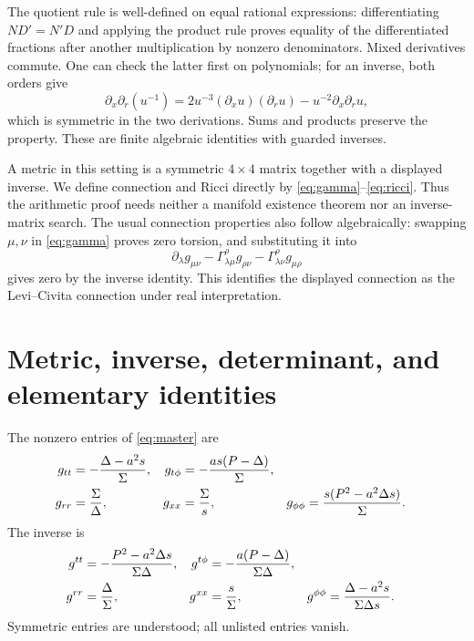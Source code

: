 \documentclass[11pt,a4paper]{article}
\numberwithin{equation}{section}
\theoremstyle{definition}\newtheorem{definition}[theorem]{Definition}
\theoremstyle{remark}\newtheorem{remark}[theorem]{Remark}
\begin{document}
The quotient rule is well-defined on equal rational expressions: differentiating $ND'=N'D$ and applying the product rule proves equality of the differentiated fractions after another multiplication by nonzero denominators. Mixed derivatives commute. One can check the latter first on polynomials; for an inverse, both orders give
\[
 \partial_x\partial_r(u^{-1})
 =2u^{-3}(\partial_xu)(\partial_ru)-u^{-2}\partial_x\partial_ru,
\]
which is symmetric in the two derivations. Sums and products preserve the property. These are finite algebraic identities with guarded inverses.

A metric in this setting is a symmetric $4\times4$ matrix together with a displayed inverse. We define connection and Ricci directly by \eqref{eq:gamma}--\eqref{eq:ricci}. Thus the arithmetic proof needs neither a manifold existence theorem nor an inverse-matrix search. The usual connection properties also follow algebraically: swapping $\mu,\nu$ in \eqref{eq:gamma} proves zero torsion, and substituting it into
\[
 \partial_\lambda g_{\mu\nu}
 -\Gamma^\rho_{\lambda\mu}g_{\rho\nu}
 -\Gamma^\rho_{\lambda\nu}g_{\mu\rho}
\]
gives zero by the inverse identity. This identifies the displayed connection as the Levi--Civita connection under real interpretation.

\section{Metric, inverse, determinant, and elementary identities}\label{sec:metric}

The nonzero entries of \eqref{eq:master} are
\begin{align}
 g_{tt}&=-\frac{\Delta-a^2s}{\Sigma},&
 g_{t\phi}&=-\frac{as(P-\Delta)}{\Sigma},\notag\\
 g_{rr}&=\frac{\Sigma}{\Delta},&g_{xx}&=\frac{\Sigma}{s},&
 g_{\phi\phi}&=\frac{s(P^2-a^2\Delta s)}{\Sigma}.\label{eq:gtable}
\end{align}
The inverse is
\begin{align}
 g^{tt}&=-\frac{P^2-a^2\Delta s}{\Sigma\Delta},&
 g^{t\phi}&=-\frac{a(P-\Delta)}{\Sigma\Delta},\notag\\
 g^{rr}&=\frac{\Delta}{\Sigma},&g^{xx}&=\frac{s}{\Sigma},&
 g^{\phi\phi}&=\frac{\Delta-a^2s}{\Sigma\Delta s}.\label{eq:ginv}
\end{align}
Symmetric entries are understood; all unlisted entries vanish.
\end{document}
